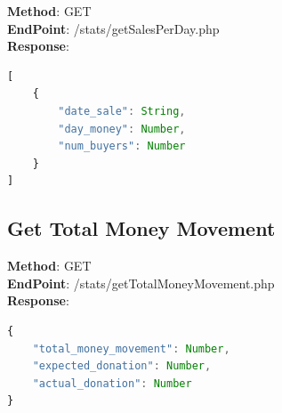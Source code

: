 \textbf{Method}: GET \\
\textbf{EndPoint}: /stats/getSalesPerDay.php \\

\textbf{Response}:
\begin{lstlisting}[language=JavaScript, basicstyle=\ttfamily]
[
    {
        "date_sale": String,
        "day_money": Number,
        "num_buyers": Number
    }
]
\end{lstlisting}

\subsection*{Get Total Money Movement}

\textbf{Method}: GET \\
\textbf{EndPoint}: /stats/getTotalMoneyMovement.php \\

\textbf{Response}:
\begin{lstlisting}[language=JavaScript, basicstyle=\ttfamily]
{
    "total_money_movement": Number,
    "expected_donation": Number,
    "actual_donation": Number
}
\end{lstlisting}